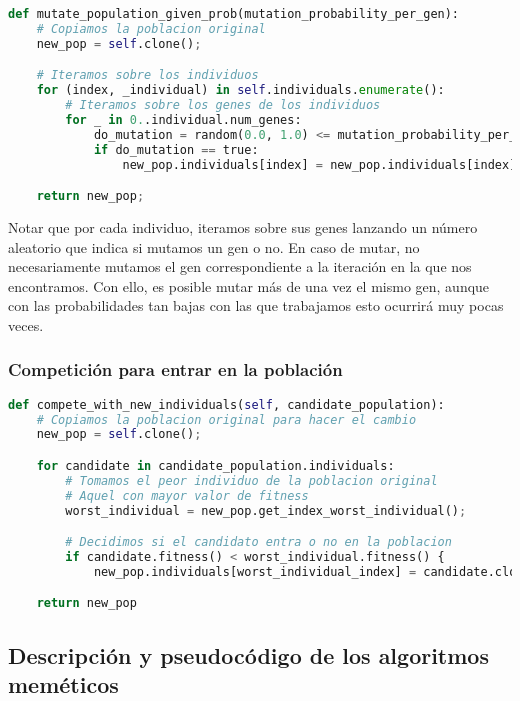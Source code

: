 \documentclass[11pt]{article}
\begin{document}
\begin{lstlisting}[language=Python, style=Boxed]
def mutate_population_given_prob(mutation_probability_per_gen):
    # Copiamos la poblacion original
    new_pop = self.clone();

    # Iteramos sobre los individuos
    for (index, _individual) in self.individuals.enumerate():
        # Iteramos sobre los genes de los individuos
        for _ in 0..individual.num_genes:
            do_mutation = random(0.0, 1.0) <= mutation_probability_per_gen;
            if do_mutation == true:
                new_pop.individuals[index] = new_pop.individuals[index].mutated();

    return new_pop;
\end{lstlisting}

Notar que por cada individuo, iteramos sobre sus genes lanzando un número aleatorio que indica si mutamos un gen o no. En caso de mutar, no necesariamente mutamos el gen correspondiente a la iteración en la que nos encontramos. Con ello, es posible mutar más de una vez el mismo gen, aunque con las probabilidades tan bajas con las que trabajamos esto ocurrirá muy pocas veces.

\subsubsection{Competición para entrar en la población}

\begin{lstlisting}[language=Python, style=Boxed]
def compete_with_new_individuals(self, candidate_population):
    # Copiamos la poblacion original para hacer el cambio
    new_pop = self.clone();

    for candidate in candidate_population.individuals:
        # Tomamos el peor individuo de la poblacion original
        # Aquel con mayor valor de fitness
        worst_individual = new_pop.get_index_worst_individual();

        # Decidimos si el candidato entra o no en la poblacion
        if candidate.fitness() < worst_individual.fitness() {
            new_pop.individuals[worst_individual_index] = candidate.clone();

    return new_pop
\end{lstlisting}

\pagebreak

\subsection{Descripción y pseudocódigo de los algoritmos meméticos}
\end{document}
